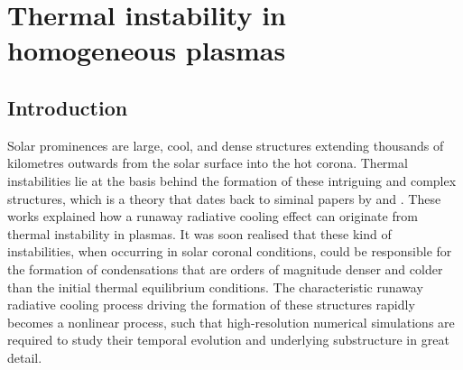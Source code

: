 \chapter{Thermal instability in homogeneous plasmas} \label{ch: thermal instability}

\graphicspath{{03-thermal_instability/figures/}}


\section{Introduction}
Solar prominences are large, cool, and dense structures extending thousands of kilometres outwards from the solar surface into the hot corona. Thermal instabilities lie at the basis behind the formation of these intriguing and complex structures, which is a theory that dates back to siminal papers by \citet{parker1953} and \citet{field1965}. These works explained how a runaway radiative cooling effect can originate from thermal instability in plasmas. It was soon realised \citep{priest1979} that these kind of instabilities, when occurring in solar coronal conditions, could be responsible for the formation of condensations that are orders of magnitude denser and colder than the initial thermal equilibrium conditions. The characteristic runaway radiative cooling process driving the formation of these structures rapidly becomes a nonlinear process, such that high-resolution numerical simulations are required to study their temporal evolution and underlying substructure in great detail.

